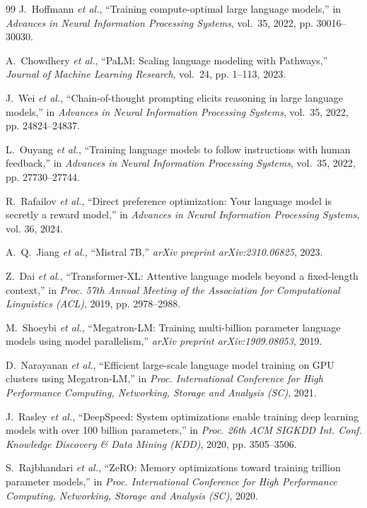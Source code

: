 \documentclass[10pt,journal]{IEEEtran}
\begin{document}
\begin{thebibliography}{99}
J.~Hoffmann \emph{et al.}, ``Training compute-optimal large language models,''
in \emph{Advances in Neural Information Processing Systems}, vol.~35, 2022, pp. 30016--30030.

A.~Chowdhery \emph{et al.}, ``PaLM: Scaling language modeling with Pathways,''
\emph{Journal of Machine Learning Research}, vol.~24, pp. 1--113, 2023.

J.~Wei \emph{et al.}, ``Chain-of-thought prompting elicits reasoning in large language models,''
in \emph{Advances in Neural Information Processing Systems}, vol.~35, 2022, pp. 24824--24837.

L.~Ouyang \emph{et al.}, ``Training language models to follow instructions with human feedback,''
in \emph{Advances in Neural Information Processing Systems}, vol.~35, 2022, pp. 27730--27744.

R.~Rafailov \emph{et al.}, ``Direct preference optimization: Your language model is secretly a reward model,''
in \emph{Advances in Neural Information Processing Systems}, vol. 36, 2024.

A.~Q.~Jiang \emph{et al.}, ``Mistral 7B,''
\emph{arXiv preprint arXiv:2310.06825}, 2023.

Z.~Dai \emph{et al.}, ``Transformer-XL: Attentive language models beyond a fixed-length context,''
in \emph{Proc. 57th Annual Meeting of the Association for Computational Linguistics (ACL)}, 2019, pp. 2978--2988.

M.~Shoeybi \emph{et al.}, ``Megatron-LM: Training multi-billion parameter language models using model parallelism,''
\emph{arXiv preprint arXiv:1909.08053}, 2019.

D.~Narayanan \emph{et al.}, ``Efficient large-scale language model training on GPU clusters using Megatron-LM,''
in \emph{Proc. International Conference for High Performance Computing, Networking, Storage and Analysis (SC)}, 2021.

J.~Rasley \emph{et al.}, ``DeepSpeed: System optimizations enable training deep learning models with over 100 billion parameters,''
in \emph{Proc. 26th ACM SIGKDD Int. Conf. Knowledge Discovery \& Data Mining (KDD)}, 2020, pp. 3505--3506.

S.~Rajbhandari \emph{et al.}, ``ZeRO: Memory optimizations toward training trillion parameter models,''
in \emph{Proc. International Conference for High Performance Computing, Networking, Storage and Analysis (SC)}, 2020.


\end{thebibliography}
\end{document}
